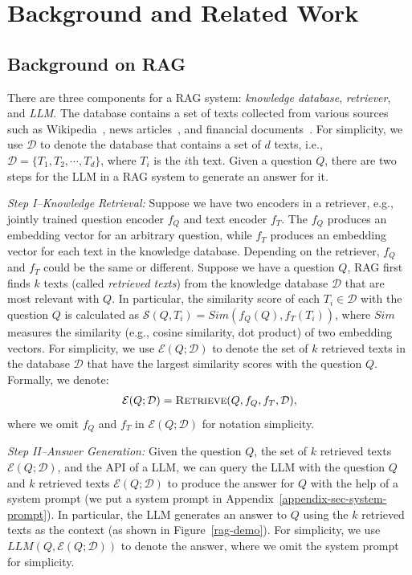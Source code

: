 \section{Background and Related Work}
\vspace{-1mm}
\subsection{Background on RAG}
\vspace{-1mm}
There are three components for a RAG system: 
\emph{knowledge database}, \emph{retriever}, and \emph{LLM}. 
The database contains a set of texts 
collected from various sources such as Wikipedia~\cite{thakur2021beir}, news articles~\cite{soboroff2019trec}, and financial documents~\cite{loukas2023making}.
For simplicity, we use $\mathcal{D}$ to denote the database that contains a set of $d$ texts, i.e., $\mathcal{D}=\{T_1, T_2, \cdots, T_d\}$, where $T_i$ is the $i$th text.
Given a question $Q$, there are two steps for the LLM in a RAG system to generate an answer for it. 

\emph{Step I--Knowledge Retrieval:}
Suppose we have two encoders in a retriever, e.g., jointly trained question encoder $f_{Q}$ and text encoder $f_T$. The $f_{Q}$ produces an embedding vector for an arbitrary question, while $f_{T}$ produces an embedding vector for each text in the knowledge database. Depending on the retriever, $f_{Q}$ and $f_{T}$ could be the same or different. 
Suppose we have a question $Q$, RAG first finds $k$ texts (called \emph{retrieved texts}) from the knowledge database $\mathcal{D}$ that are most relevant with $Q$. In particular, the similarity score of each $T_i \in \mathcal{D}$ with the question $Q$ is calculated as $\mathcal{S}(Q, T_i)=Sim(f_{Q}(Q), f_{T}(T_i))$, where $Sim$ measures the similarity (e.g., cosine similarity, dot product) of two embedding vectors. 
For simplicity, we use $\mathcal{E}(Q; \mathcal{D})$ to denote the set of $k$ retrieved texts in the database $\mathcal{D}$ that have the largest similarity scores with the question $Q$. Formally, we denote:
{\small
\begin{align}
    \mathcal{E}(Q; \mathcal{D})=\textsc{Retrieve}(Q, f_Q, f_T, \mathcal{D}),
\end{align}}
where we omit $f_Q$ and $f_T$ in $\mathcal{E}(Q; \mathcal{D})$ for notation simplicity. 

\emph{Step II--Answer Generation:} Given the question $Q$, the set of $k$ retrieved texts $\mathcal{E}(Q; \mathcal{D})$, and the API of a LLM, we can query the LLM with the question $Q$ and $k$ retrieved texts $\mathcal{E}(Q; \mathcal{D})$ to produce the answer for $Q$ with the help of a system prompt (we put a system prompt in Appendix~\ref{appendix-sec-system-prompt}). In particular, the LLM generates an answer to $Q$ using the $k$ retrieved texts as the context (as shown in Figure~\ref{rag-demo}). For simplicity, we use $LLM(Q, \mathcal{E}(Q; \mathcal{D}))$ to denote the answer, where we omit the system prompt for simplicity. 


